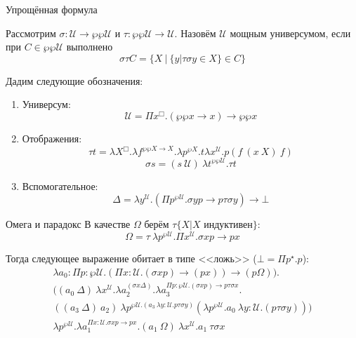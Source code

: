 \documentclass[aspectratio=169,dvipsnames,usenames]{beamer}
\begin{document}
\begin{frame}{Упрощённая формула}

Рассмотрим $\sigma: \mathcal{U} \rightarrow \wp\wp\mathcal{U}$ и $\tau: \wp\wp\mathcal{U}\rightarrow\mathcal{U}$.
Назовём $\mathcal{U}$ мощным универсумом, если при $C \in \wp\wp\mathcal{U}$ выполнено
$$\sigma\tau C = \{ X\ |\ \{y | \tau\sigma y \in X \} \in C\}$$

Дадим следующие обозначения:
\begin{enumerate}
\item Универсум: $$\mathcal{U} = \Pi x^\Box.(\wp\wp x \rightarrow x) \rightarrow \wp\wp x$$

\item Отображения:
       $$\tau t = \lambda X^\Box.\lambda f ^{\wp\wp X \rightarrow X}.\lambda p^{\wp X}.t \lambda x^\mathcal{U}.p (f\ (x\ X)\ f)$$
       $$\sigma s = (s\ \mathcal{U})\ \lambda t ^ {\wp\wp\mathcal{U}}.\tau t$$

\item Вспомогательное:
       $$\Delta = \lambda y ^ \mathcal{U}. (\Pi p ^ {\wp\mathcal{U}}.\sigma y p \rightarrow p \tau \sigma y) \rightarrow \bot$$

\end{enumerate}
\end{frame}

\begin{frame}{Омега и парадокс}
В качестве $\Omega$ берём $\tau \{ X | X \text{ индуктивен}\}$:
$$\Omega = \tau\ \lambda p ^ {\wp\mathcal{U}} . \Pi x ^ \mathcal{U} . \sigma x p \rightarrow p x$$

Тогда следующее выражение обитает в типе <<ложь>> ($\bot = \Pi p^\star.p$):
$$\begin{array}{c}\lambda a_0 : \Pi p : \wp \mathcal{U} . (\Pi x : \mathcal{U} . (\sigma x p) \rightarrow (p x)) \rightarrow (p \Omega)).\\
  ((a_0\ \Delta)\ \lambda x ^ {\mathcal{U}}.\lambda a_2 ^ {(\sigma x \Delta)}.\lambda a_3^ {\Pi p : \wp\mathcal{U}.(\sigma x p)\rightarrow p \tau \sigma x}.\\
  ((a_3\ \Delta)\ a_2)\ \lambda p^{\wp\mathcal{U}.(a_3\ \lambda y : \mathcal{U}.p \tau\sigma y)} (\lambda p^{\wp\mathcal{U}}.a_0\ \lambda y: \mathcal{U}.(p \tau\sigma y)))\\
  \lambda p^{\wp\mathcal{U}}.\lambda a_1 ^ {\Pi x:\mathcal{U}.\sigma x p \rightarrow p x}.(a_1\ \Omega)\ \lambda x^\mathcal{U}.a_1\ \tau\sigma x\end{array}
$$
\end{frame}
\end{document}
